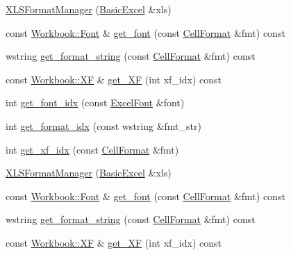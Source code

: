 \begin{DoxyCompactItemize}
\hyperlink{struct_excel_format_1_1_x_l_s_format_manager_a135d0170d3e818869c0106bfaff242d3}{X\+L\+S\+Format\+Manager} (\hyperlink{class_y_excel_1_1_basic_excel}{Basic\+Excel} \&xls)
\item 
const \hyperlink{struct_y_excel_1_1_workbook_1_1_font}{Workbook\+::\+Font} \& \hyperlink{struct_excel_format_1_1_x_l_s_format_manager_a8ea73be60080799becc225c8dacabe5b}{get\+\_\+font} (const \hyperlink{struct_excel_format_1_1_cell_format}{Cell\+Format} \&fmt) const 
\item 
wstring \hyperlink{struct_excel_format_1_1_x_l_s_format_manager_a248a6f46fa8a8e261e4f5aa72dc5049f}{get\+\_\+format\+\_\+string} (const \hyperlink{struct_excel_format_1_1_cell_format}{Cell\+Format} \&fmt) const 
\item 
const \hyperlink{struct_y_excel_1_1_workbook_1_1_x_f}{Workbook\+::\+X\+F} \& \hyperlink{struct_excel_format_1_1_x_l_s_format_manager_a3746bceb822b2313eef790714690fbb0}{get\+\_\+\+X\+F} (int xf\+\_\+idx) const 
\item 
int \hyperlink{struct_excel_format_1_1_x_l_s_format_manager_a0686d192c2cde11ff49b647c35ac2889}{get\+\_\+font\+\_\+idx} (const \hyperlink{struct_excel_format_1_1_excel_font}{Excel\+Font} \&font)
\item 
int \hyperlink{struct_excel_format_1_1_x_l_s_format_manager_af302205c76b66f5b33ba85b525ebec49}{get\+\_\+format\+\_\+idx} (const wstring \&fmt\+\_\+str)
\item 
int \hyperlink{struct_excel_format_1_1_x_l_s_format_manager_ab3a29701bcad0fd1d8fce596def767a3}{get\+\_\+xf\+\_\+idx} (const \hyperlink{struct_excel_format_1_1_cell_format}{Cell\+Format} \&fmt)
\item 
\hyperlink{struct_excel_format_1_1_x_l_s_format_manager_a135d0170d3e818869c0106bfaff242d3}{X\+L\+S\+Format\+Manager} (\hyperlink{class_y_excel_1_1_basic_excel}{Basic\+Excel} \&xls)
\item 
const \hyperlink{struct_y_excel_1_1_workbook_1_1_font}{Workbook\+::\+Font} \& \hyperlink{struct_excel_format_1_1_x_l_s_format_manager_a8ea73be60080799becc225c8dacabe5b}{get\+\_\+font} (const \hyperlink{struct_excel_format_1_1_cell_format}{Cell\+Format} \&fmt) const 
\item 
wstring \hyperlink{struct_excel_format_1_1_x_l_s_format_manager_a248a6f46fa8a8e261e4f5aa72dc5049f}{get\+\_\+format\+\_\+string} (const \hyperlink{struct_excel_format_1_1_cell_format}{Cell\+Format} \&fmt) const 
\item 
const \hyperlink{struct_y_excel_1_1_workbook_1_1_x_f}{Workbook\+::\+X\+F} \& \hyperlink{struct_excel_format_1_1_x_l_s_format_manager_a3746bceb822b2313eef790714690fbb0}{get\+\_\+\+X\+F} (int xf\+\_\+idx) const 

\end{DoxyCompactItemize}
